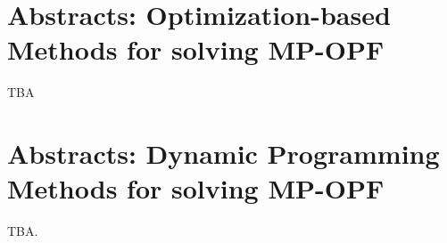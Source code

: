 \chapter{Abstracts: Optimization-based Methods for solving MP-OPF}
TBA

\chapter{Abstracts: Dynamic Programming Methods for solving MP-OPF}
TBA.